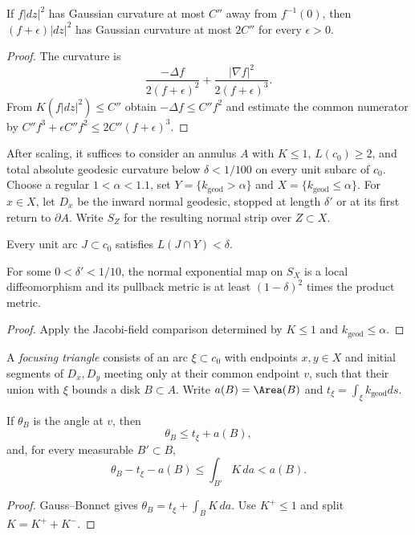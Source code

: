 \begin{claim}
\label{claim:perturbed-metric-curvature-bound}
If $f|dz|^2$ has Gaussian curvature at most $C''$ away from $f^{-1}(0)$, then
$(f+\epsilon)|dz|^2$ has Gaussian curvature at most $2C''$ for every
$\epsilon>0$.
\end{claim}
\begin{proof}
\sketch The curvature is
\[
\frac{-\Delta f}{2(f+\epsilon)^2}
+\frac{|\nabla f|^2}{2(f+\epsilon)^3}.
\]
From $K(f|dz|^2)\le C''$ obtain $-\Delta f\le C''f^2$ and estimate the common
numerator by $C''f^3+\epsilon C''f^2\le2C''(f+\epsilon)^3$.
\end{proof}

After scaling, it suffices to consider an annulus $A$ with $K\le1$,
$L(c_0)\ge2$, and total absolute geodesic curvature below $\delta<1/100$ on
every unit subarc of $c_0$. Choose a regular $1<\alpha<1.1$, set
$Y=\{k_{\mathrm{geod}}>\alpha\}$ and $X=\{k_{\mathrm{geod}}\le\alpha\}$. For
$x\in X$, let $D_x$ be the inward normal geodesic, stopped at length
$\delta'$ or at its first return to $\partial A$. Write $S_Z$ for the resulting
normal strip over $Z\subset X$.

\begin{remark}
\label{rem:high-curvature-set-length-bound}
\label{Ylengthrem}
Every unit arc $J\subset c_0$ satisfies $L(J\cap Y)<\delta$.
\end{remark}

\begin{claim}
\label{claim:exponential-map-local-diffeomorphism}
\label{expcomp}
For some $0<\delta'<1/10$, the normal exponential map on $S_X$ is a local
diffeomorphism and its pullback metric is at least $(1-\delta)^2$ times the
product metric.
\end{claim}
\begin{proof}
\sketch Apply the Jacobi-field comparison determined by $K\le1$ and
$k_{\mathrm{geod}}\le\alpha$.
\end{proof}

A \emph{focusing triangle} consists of an arc $\xi\subset c_0$ with endpoints
$x,y\in X$ and initial segments of $D_x,D_y$ meeting only at their common
endpoint $v$, such that their union with $\xi$ bounds a disk $B\subset A$.
Write $a(B)=\Area(B)$ and
$t_\xi=\int_\xi k_{\mathrm{geod}}ds$.

\begin{claim}
\label{claim:focusing-triangle-angle-curvature-bound}
\label{theta/Kbd}
If $\theta_B$ is the angle at $v$, then
\[
\theta_B\le t_\xi+a(B),
\]
and, for every measurable $B'\subset B$,
\[
\theta_B-t_\xi-a(B)\le\int_{B'}K\,da<a(B).
\]
\end{claim}
\begin{proof}
\sketch Gauss--Bonnet gives
$\theta_B=t_\xi+\int_BK\,da$. Use $K^+\le1$ and split $K=K^++K^-$.
\end{proof}

